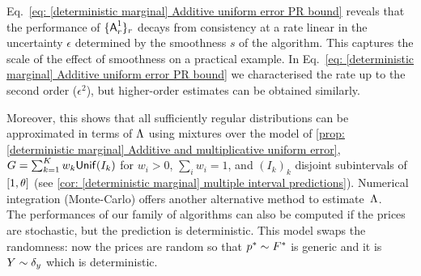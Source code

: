 Eq.~\eqref{eq: [deterministic marginal] Additive uniform error PR bound} reveals that the performance of $\{\mbox{\textup{\textsf{A}}}^1_r\}_{r}$ decays from consistency at a rate linear in the uncertainty $\epsilon$ determined by the smoothness $s$ of the algorithm. This captures the scale of the effect of smoothness on a practical example. In Eq.~\eqref{eq: [deterministic marginal] Additive uniform error PR bound} we characterised the rate up to the second order ($\epsilon^2$), but higher-order estimates can be obtained similarly.
%


Moreover, this shows that all sufficiently regular distributions can be approximated in terms of $\Lambda$ using mixtures over the model of \cref{prop: [deterministic marginal] Additive and multiplicative uniform error}, \ie $G=\sum_{k=1}^{K}w_k\mbox{\textup{\textsf{Unif}}}(I_k)$ for $w_i>0$, $\sum_i w_i=1$, and $(I_k)_k$ disjoint subintervals of $[1,\theta]$ (see \cref{cor: [deterministic marginal] multiple interval predictions}). Numerical integration (\eg Monte-Carlo) offers another alternative method to estimate~$\Lambda$.\\


\noindent
{}
The performances of our family of algorithms can also be computed if the prices are stochastic, but the prediction is deterministic. This model swaps the randomness: now the prices are random so that $p^*\sim F^*$ is generic and it is $Y\sim \delta_y$ which is deterministic. 

